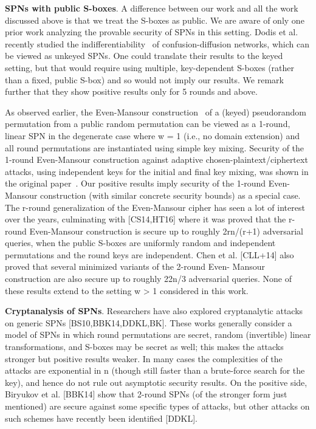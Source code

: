 {\bf SPNs with public S-boxes}. A difference between our work and all the work
discussed above is that we treat the S-boxes as public. We are aware of only
one prior work analyzing the provable security of SPNs in this setting. Dodis
et al.~\cite{EC:DSSL16} recently studied the indifferentiability~\cite{TCC:MauRenHol04} of confusion-diffusion
networks, which can be viewed as unkeyed SPNs. One could translate
their results to the keyed setting, but that would require using multiple, key-dependent
S-boxes (rather than a fixed, public S-box) and so would not imply
our results. We remark further that they show positive results only for 5 rounds
and above.


As observed earlier, the Even-Mansour construction~\cite{JC:EveMan97} of a (keyed) pseudorandom permutation from a public random permutation can be viewed
as a 1-round, linear SPN in the degenerate case where w = 1 (i.e., no domain
extension) and all round permutations are instantiated using simple key mixing.
Security of the 1-round Even-Mansour construction against adaptive chosen-plaintext/ciphertext attacks, using independent keys for the initial and final key mixing, was shown in the original paper~\cite{JC:EveMan97}. Our positive results imply
security of the 1-round Even-Mansour construction (with similar concrete security
bounds) as a special case. The r-round generalization of the Even-Mansour
cipher has seen a lot of interest over the years, culminating with [CS14,HT16]
where it was proved that the r-round Even-Mansour construction is secure up to
roughly 2rn/(r+1) adversarial queries, when the public S-boxes are uniformly random
and independent permutations and the round keys are independent. Chen et
al. [CLL+14] also proved that several minimized variants of the 2-round Even-
Mansour construction are also secure up to roughly 22n/3 adversarial queries.
None of these results extend to the setting w > 1 considered in this work.





{\bf Cryptanalysis of SPNs}. Researchers have also explored cryptanalytic attacks
on generic SPNs [BS10,BBK14,DDKL,BK]. These works generally consider a
model of SPNs in which round permutations are secret, random (invertible) linear
transformations, and S-boxes may be secret as well; this makes the attacks
stronger but positive results weaker. In many cases the complexities of the
attacks are exponential in n (though still faster than a brute-force search for
the key), and hence do not rule out asymptotic security results. On the positive
side, Biryukov et al. [BBK14] show that 2-round SPNs (of the stronger form just
mentioned) are secure against some specific types of attacks, but other attacks
on such schemes have recently been identified [DDKL].


